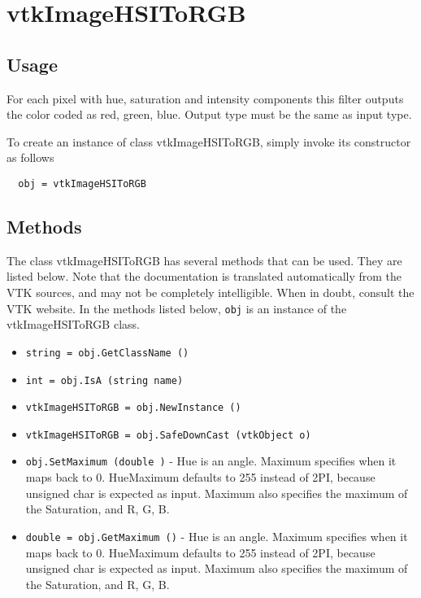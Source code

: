 \section{vtkImageHSIToRGB}

\subsection{Usage}

 For each pixel with hue, saturation and intensity components this filter
 outputs the color coded as red, green, blue.  Output type must be the same
 as input type.

To create an instance of class vtkImageHSIToRGB, simply
invoke its constructor as follows
\begin{verbatim}
  obj = vtkImageHSIToRGB
\end{verbatim}
\subsection{Methods}

The class vtkImageHSIToRGB has several methods that can be used.
  They are listed below.
Note that the documentation is translated automatically from the VTK sources,
and may not be completely intelligible.  When in doubt, consult the VTK website.
In the methods listed below, \verb|obj| is an instance of the vtkImageHSIToRGB class.
\begin{itemize}
\item  \verb|string = obj.GetClassName ()|

\item  \verb|int = obj.IsA (string name)|

\item  \verb|vtkImageHSIToRGB = obj.NewInstance ()|

\item  \verb|vtkImageHSIToRGB = obj.SafeDownCast (vtkObject o)|

\item  \verb|obj.SetMaximum (double )| -  Hue is an angle. Maximum specifies when it maps back to 0.
 HueMaximum defaults to 255 instead of 2PI, because unsigned char
 is expected as input.
 Maximum also specifies the maximum of the Saturation, and R, G, B.

\item  \verb|double = obj.GetMaximum ()| -  Hue is an angle. Maximum specifies when it maps back to 0.
 HueMaximum defaults to 255 instead of 2PI, because unsigned char
 is expected as input.
 Maximum also specifies the maximum of the Saturation, and R, G, B.

\end{itemize}
